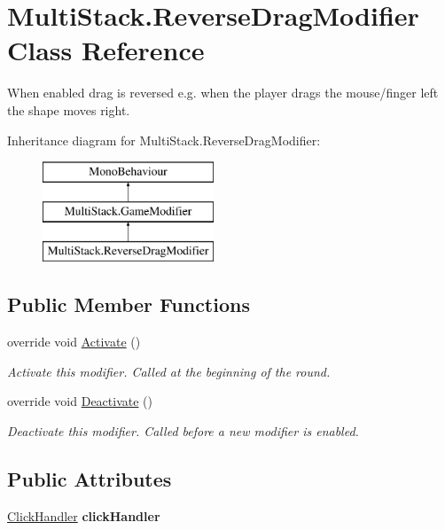\hypertarget{class_multi_stack_1_1_reverse_drag_modifier}{}\section{Multi\+Stack.\+Reverse\+Drag\+Modifier Class Reference}
\label{class_multi_stack_1_1_reverse_drag_modifier}


When enabled drag is reversed e.\+g. when the player drags the mouse/finger left the shape moves right.  


Inheritance diagram for Multi\+Stack.\+Reverse\+Drag\+Modifier\+:\begin{figure}[H]
\begin{center}
\leavevmode
\includegraphics[height=3.000000cm]{class_multi_stack_1_1_reverse_drag_modifier}
\end{center}
\end{figure}
\subsection*{Public Member Functions}
\begin{DoxyCompactItemize}
\item 
override void \hyperlink{class_multi_stack_1_1_reverse_drag_modifier_a4210fbc0eb598a7b4f31976407e4e1ff}{Activate} ()
\begin{DoxyCompactList}\small\item\em Activate this modifier. Called at the beginning of the round. \end{DoxyCompactList}\item 
override void \hyperlink{class_multi_stack_1_1_reverse_drag_modifier_a32d5963443ed0867c51c97f76128d3ec}{Deactivate} ()
\begin{DoxyCompactList}\small\item\em Deactivate this modifier. Called before a new modifier is enabled. \end{DoxyCompactList}\end{DoxyCompactItemize}
\subsection*{Public Attributes}
\begin{DoxyCompactItemize}
\item 
\hypertarget{class_multi_stack_1_1_reverse_drag_modifier_a683166c961dfdb5f7eeed6fa2b5d0379}{}\hyperlink{class_multi_stack_1_1_click_handler}{Click\+Handler} {\bfseries click\+Handler}\label{class_multi_stack_1_1_reverse_drag_modifier_a683166c961dfdb5f7eeed6fa2b5d0379}

\end{DoxyCompactItemize}


